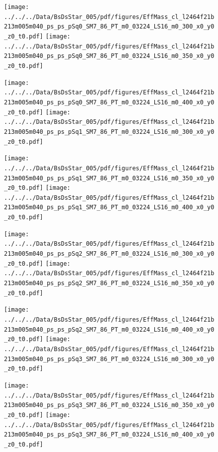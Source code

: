 \documentclass[a4paper,10pt]{article}
\begin{document}
\begin{figure}[p]
 \texttt{[image: ../../../Data/BsDsStar\_005/pdf/figures/EffMass\_cl\_l2464f21b213m005m040\_ps\_ps\_pSq0\_SM7\_86\_PT\_m0\_03224\_LS16\_m0\_300\_x0\_y0\_z0\_t0.pdf]} 
 \texttt{[image: ../../../Data/BsDsStar\_005/pdf/figures/EffMass\_cl\_l2464f21b213m005m040\_ps\_ps\_pSq0\_SM7\_86\_PT\_m0\_03224\_LS16\_m0\_350\_x0\_y0\_z0\_t0.pdf]} 
 \end{figure}
\begin{figure}[p]
 \texttt{[image: ../../../Data/BsDsStar\_005/pdf/figures/EffMass\_cl\_l2464f21b213m005m040\_ps\_ps\_pSq0\_SM7\_86\_PT\_m0\_03224\_LS16\_m0\_400\_x0\_y0\_z0\_t0.pdf]} 
 \texttt{[image: ../../../Data/BsDsStar\_005/pdf/figures/EffMass\_cl\_l2464f21b213m005m040\_ps\_ps\_pSq1\_SM7\_86\_PT\_m0\_03224\_LS16\_m0\_300\_x0\_y0\_z0\_t0.pdf]} 
 \end{figure}
\begin{figure}[p]
 \texttt{[image: ../../../Data/BsDsStar\_005/pdf/figures/EffMass\_cl\_l2464f21b213m005m040\_ps\_ps\_pSq1\_SM7\_86\_PT\_m0\_03224\_LS16\_m0\_350\_x0\_y0\_z0\_t0.pdf]} 
 \texttt{[image: ../../../Data/BsDsStar\_005/pdf/figures/EffMass\_cl\_l2464f21b213m005m040\_ps\_ps\_pSq1\_SM7\_86\_PT\_m0\_03224\_LS16\_m0\_400\_x0\_y0\_z0\_t0.pdf]} 
 \end{figure}
\clearpage
\begin{figure}[p]
 \texttt{[image: ../../../Data/BsDsStar\_005/pdf/figures/EffMass\_cl\_l2464f21b213m005m040\_ps\_ps\_pSq2\_SM7\_86\_PT\_m0\_03224\_LS16\_m0\_300\_x0\_y0\_z0\_t0.pdf]} 
 \texttt{[image: ../../../Data/BsDsStar\_005/pdf/figures/EffMass\_cl\_l2464f21b213m005m040\_ps\_ps\_pSq2\_SM7\_86\_PT\_m0\_03224\_LS16\_m0\_350\_x0\_y0\_z0\_t0.pdf]} 
 \end{figure}
\begin{figure}[p]
 \texttt{[image: ../../../Data/BsDsStar\_005/pdf/figures/EffMass\_cl\_l2464f21b213m005m040\_ps\_ps\_pSq2\_SM7\_86\_PT\_m0\_03224\_LS16\_m0\_400\_x0\_y0\_z0\_t0.pdf]} 
 \texttt{[image: ../../../Data/BsDsStar\_005/pdf/figures/EffMass\_cl\_l2464f21b213m005m040\_ps\_ps\_pSq3\_SM7\_86\_PT\_m0\_03224\_LS16\_m0\_300\_x0\_y0\_z0\_t0.pdf]} 
 \end{figure}
\begin{figure}[p]
 \texttt{[image: ../../../Data/BsDsStar\_005/pdf/figures/EffMass\_cl\_l2464f21b213m005m040\_ps\_ps\_pSq3\_SM7\_86\_PT\_m0\_03224\_LS16\_m0\_350\_x0\_y0\_z0\_t0.pdf]} 
 \texttt{[image: ../../../Data/BsDsStar\_005/pdf/figures/EffMass\_cl\_l2464f21b213m005m040\_ps\_ps\_pSq3\_SM7\_86\_PT\_m0\_03224\_LS16\_m0\_400\_x0\_y0\_z0\_t0.pdf]} 
 \end{figure}
\end{document}
